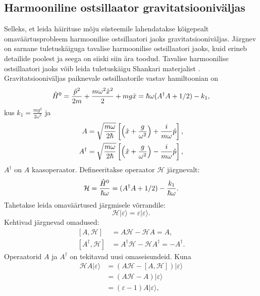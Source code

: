 \documentclass{trkut}%
\renewcommand\ket[1]{{|{#1}\rangle}}
\begin{document}
\subsection{Harmooniline ostsillaator gravitatsiooniväljas}

Selleks, et leida häirituse mõju süsteemile lahendatakse kõigepealt omaväärtusprobleem harmoonilise ostsillaatori jaoks gravitatsiooniväljas.
Järgnev on sarnane tuletuskäiguga tavalise harmoonilise ostsillaatori jaoks, kuid erineb detailide poolest ja seega on siiski siin ära toodud.
Tavalise harmoonilise ostsillaatori jaoks võib leida tuletuskäigu Shankari materjalist \parencite[202-216]{shankar94}.
Gravitatsiooniväljas paiknevale ostsillaatorile vastav hamiltoonian on
\begin{equation}
    \op[0]{H}=\frac{\op{p}^2}{2m}+\frac{m\omega^2 \op{x}^2}{2} + mg\op{x}=\hbar \omega (A^\dagger A + 1/2)-k_1,
\end{equation}
kus $k_1=\frac{mg^2}{2\omega^2}$ ja
\begin{align}
    \begin{split}
        A &= \sqrt{\frac{m\omega}{2\hbar}}\left[ \left( \op{x} + \frac{g}{\omega^2} \right) + \frac{i}{m\omega} \op{p} \right], \\
        A^\dagger &= \sqrt{\frac{m\omega}{2\hbar}}\left[ \left( \op{x} + \frac{g}{\omega^2} \right) - \frac{i}{m\omega} \op{p} \right],
    \end{split}
\end{align}
$A^\dagger$ on $A$ kaasoperaator.
Defineeritakse operaator $\mathcal{H}$ järgnevalt:
\begin{equation}
    \mathcal{H} = \frac{\op[0]{H}}{\hbar \omega}=(A^\dagger A + 1/2)-\frac{k_1}{\hbar \omega}.
    \label{mathcalH}
\end{equation}
Tahetakse leida omaväärtused järgmisele võrrandile:
\begin{equation}
    \mathcal{H}\ket{\varepsilon}=\varepsilon \ket{\varepsilon}.
\end{equation}
Kehtivad järgnevad omadused:
\begin{align}
    \left[A, \mathcal{H}\right] &=A\mathcal{H} - \mathcal{H}A=A, \\
    \left[A^\dagger, \mathcal{H}\right] &= A^\dagger \mathcal{H} - \mathcal{H} A^\dagger = -A^\dagger.
\end{align}
Operaatorid $A$ ja $A^\dagger$ on tekitavad uusi omaseisundeid. Kuna
\begin{align}
    \mathcal{H}A\ket{\varepsilon}&=\left(A\mathcal{H}-[A, \mathcal{H}]\right)\ket{\varepsilon} \nonumber\\
    &=(A\mathcal{H}-A)\ket{\varepsilon} \nonumber\\
    &=(\varepsilon - 1)A\ket{\varepsilon},
\end{align}
\end{document}
